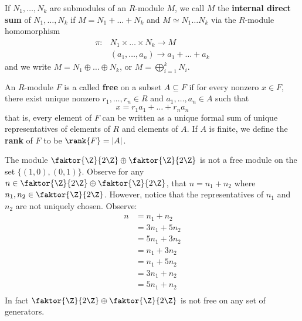 \begin{definition}
  If $N_1, \dots, N_k$ are submodules of an $R$-module  $M$, we call
  $M$ the  \textbf{internal direct sum} of $N_1, \dots, N_k$ if
  $M=N_1+\dots+N_k$ and $M \simeq N_1 \dots N_k$ via the $R$-module
  homomorphism
  \begin{align*}
    \pi:  & N_1 \times \dots \times N_k \xrightarrow{} M  \\
          & (a_1, \dots, a_n) \xrightarrow{} a_1+\dots+a_k
  \end{align*}
  and we write $M=N_1 \oplus \dots \oplus N_k$, or
  $M=\bigoplus_{i=1}^k{N_i}$.
\end{definition}

\begin{definition}
  An $R$-module  $F$ is a called \textbf{free} on a subset $A
  \subseteq F$ if for every nonzero $x \in F$, there exist unique
  nonzero $r_1, \dots, r_n \in R$ and $a_1, \dots, a_n \in A$ such
  that
  \begin{equation*}
    x=r_1a_1+\dots+r_na_n
  \end{equation*}
  that is, every element of $F$ can be written as a unique formal sum
  of unique representatives of elements of $R$ and elements of $A$. If
  $A$ is finite, we define the \textbf{rank} of $F$ to be
  $\rank{F}=|A|$.
\end{definition}

\begin{example}\label{example_4.5}
  The module $\faktor{\Z}{2\Z} \oplus \faktor{\Z}{2\Z}$ is not a free
  module on the set $\{(1,0), (0,1)\}$. Observe for any $n \in
  \faktor{\Z}{2\Z} \oplus \faktor{\Z}{2\Z}$, that $n=n_1+n_2$ where
  $n_1,n_2 \in \faktor{\Z}{2\Z}$. However, notice that the
  representatives of $n_1$ and $n_2$ are not uniquely chosen. Observe:
  \begin{align*}
    n &=  n_1+n_2 \\
      &=  3n_1+5n_2 \\
      &=  5n_1+3n_2 \\
      &=  n_1+3n_2 \\
      &=  n_1+5n_2 \\
      &=  3n_1+n_2 \\
      &=  5n_1+n_2 \\
  \end{align*}
  In fact $\faktor{\Z}{2\Z} \oplus \faktor{\Z}{2\Z}$ is not free on
  any set of generators.
\end{example}

